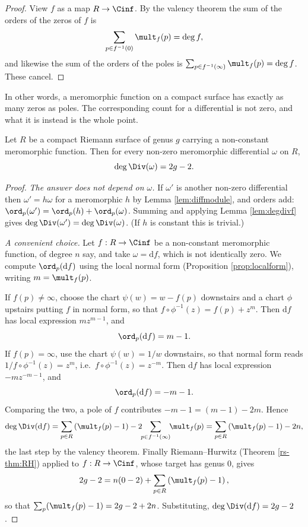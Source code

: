 \begin{proof}
	View $f$ as a map $R \to \Cinf$. By the valency theorem the sum of the orders of the
	zeros of $f$ is
	$$
	\sum_{p \in f^{-1}(0)}\mult_f(p) = \deg f,
	$$
	and likewise the sum of the orders of the poles is
	$\sum_{p\in f^{-1}(\infty)}\mult_f(p) = \deg f$. These cancel.
\end{proof}

In other words, a meromorphic function on a compact surface has exactly as many zeros as
poles. The corresponding count for a differential is not zero, and what it is instead is
the whole point.

\begin{theorem}\label{thm:canonicaldegree}
	Let $R$ be a compact Riemann surface of genus $g$ carrying a non-constant meromorphic
	function. Then for every non-zero meromorphic differential $\omega$ on $R$,
	$$
	\deg\Div(\omega) = 2g - 2.
	$$
\end{theorem}

\begin{proof}
	\emph{The answer does not depend on $\omega$.} If $\omega'$ is another non-zero
	differential then $\omega' = h\omega$ for a meromorphic $h$ by Lemma
	\ref{lem:diffmodule}, and orders add: $\ord_p(\omega') = \ord_p(h) + \ord_p(\omega)$.
	Summing and applying Lemma \ref{lem:degdivf} gives
	$\deg\Div(\omega') = \deg\Div(\omega)$. (If $h$ is constant this is trivial.)

	\emph{A convenient choice.} Let $f : R \to \Cinf$ be a non-constant meromorphic
	function, of degree $n$ say, and take $\omega = \mathrm{d}f$, which is not identically zero.
	We compute $\ord_p(\mathrm{d}f)$ using the local normal form (Proposition
	\ref{prop:localform}), writing $m = \mult_f(p)$.

	If $f(p) \neq \infty$, choose the chart $\psi(w) = w - f(p)$ downstairs and a chart
	$\phi$ upstairs putting $f$ in normal form, so that
	$f\circ\phi^{-1}(z) = f(p) + z^m$. Then $\mathrm{d}f$ has local expression $mz^{m-1}$, and
	$$
	\ord_p(\mathrm{d}f) = m - 1.
	$$
	If $f(p) = \infty$, use the chart $\psi(w) = 1/w$ downstairs, so that normal form reads
	$1/f\circ\phi^{-1}(z) = z^m$, i.e.\ $f\circ\phi^{-1}(z) = z^{-m}$. Then $\mathrm{d}f$ has
	local expression $-mz^{-m-1}$, and
	$$
	\ord_p(\mathrm{d}f) = -m-1.
	$$
	Comparing the two, a pole of $f$ contributes $-m-1 = (m-1) - 2m$. Hence
	$$
	\deg\Div(\mathrm{d}f) = \sum_{p\in R}\left(\mult_f(p)-1\right)
	- 2\!\!\sum_{p\in f^{-1}(\infty)}\!\!\mult_f(p)
	= \sum_{p\in R}\left(\mult_f(p)-1\right) - 2n,
	$$
	the last step by the valency theorem. Finally Riemann--Hurwitz (Theorem \ref{rs-thm:RH})
	applied to $f : R \to \Cinf$, whose target has genus $0$, gives
	$$
	2g-2 = n(0 - 2) + \sum_{p\in R}\left(\mult_f(p)-1\right),
	$$
	so that $\sum_p(\mult_f(p)-1) = 2g-2+2n$. Substituting, $\deg\Div(\mathrm{d}f) = 2g-2$.
\end{proof}

